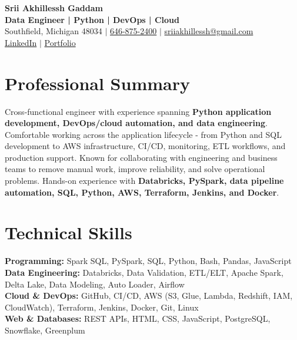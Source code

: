 \documentclass[letterpaper,10pt]{article}
\begin{document}
\fontsize{9.35pt}{10.45pt}\selectfont

\begin{center}
    {\LARGE \textbf{Srii Akhillessh Gaddam}} \\[-1pt]
    \textbf{Data Engineer | Python | DevOps | Cloud} \\[2pt]
    Southfield, Michigan 48034 $|$
    \href{tel:6468752400}{646-875-2400} $|$
    \href{mailto:sriiakhillessh@gmail.com}{sriiakhillessh@gmail.com} \\[1pt]
    \href{https://www.linkedin.com/in/srii-akhiilessh-gaddam-b48668191/}{LinkedIn} $|$
    \href{https://sriiakhillesshg.github.io/portfolio/}{Portfolio}
\end{center}
\vspace{-8pt}

\section{Professional Summary}
\small{Cross-functional engineer with experience spanning \textbf{Python application development, DevOps/cloud automation, and data engineering}. Comfortable working across the application lifecycle - from Python and SQL development to AWS infrastructure, CI/CD, monitoring, ETL workflows, and production support. Known for collaborating with engineering and business teams to remove manual work, improve reliability, and solve operational problems. Hands-on experience with \textbf{Databricks, PySpark, data pipeline automation, SQL, Python, AWS, Terraform, Jenkins, and Docker}.}

\section{Technical Skills}
\small{
\textbf{Programming:} Spark SQL, PySpark, SQL, Python, Bash, Pandas, JavaScript \\
\textbf{Data Engineering:} Databricks, Data Validation, ETL/ELT, Apache Spark, Delta Lake, Data Modeling, Auto Loader, Airflow \\
\textbf{Cloud \& DevOps:} GitHub, CI/CD, AWS (S3, Glue, Lambda, Redshift, IAM, CloudWatch), Terraform, Jenkins, Docker, Git, Linux \\
\textbf{Web \& Databases:} REST APIs, HTML, CSS, JavaScript, PostgreSQL, Snowflake, Greenplum
}

\end{document}
